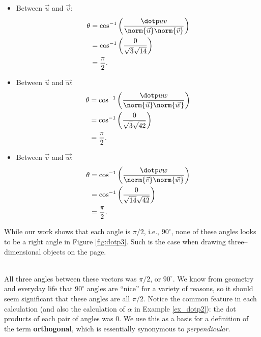{\begin{itemize}
	\item Between $\vec u$ and $\vec v$:
	\begin{align*}
	\theta &= \cos^{-1}\left(\frac{\dotp uv}{\norm{\vec u}\norm{\vec v}}\right)\\
					&= \cos^{-1}\left(\frac{0}{\sqrt{3}\sqrt{14}}\right)\\
					&= \frac{\pi}2.
	\end{align*}
	\item	Between $\vec u$ and $\vec w$:
	\begin{align*}
	\theta &= \cos^{-1}\left(\frac{\dotp uw}{\norm{\vec u}\norm{\vec w}}\right)\\
					&= \cos^{-1}\left(\frac{0}{\sqrt{3}\sqrt{42}}\right)\\
					&= \frac{\pi}2.
	\end{align*}
	\item	Between $\vec v$ and $\vec w$:
	\begin{align*}
	\theta &= \cos^{-1}\left(\frac{\dotp vw}{\norm{\vec v}\norm{\vec w}}\right)\\
					&= \cos^{-1}\left(\frac{0}{\sqrt{14}\sqrt{42}}\right)\\
					&= \frac{\pi}2.
	\end{align*}
\end{itemize}
While our work shows that each angle is $\pi/2$, i.e.,  $90^\circ$, none of these angles looks to be a right angle in Figure \ref{fig:dotp3}. Such is the case when drawing three--dimensional objects on the page.
}\\

All three angles between these vectors was $\pi/2$, or $90^\circ$. We know from geometry and everyday life that $90^\circ$ angles are ``nice'' for a variety of reasons, so it should seem significant that these angles are all $\pi/2$. Notice the common feature in each calculation (and also the calculation of $\alpha$ in Example \ref{ex_dotp2}): the dot products of each pair of angles was 0. We use this as a basis for a definition of the term \textbf{orthogonal}, which is essentially synonymous to \textit{perpendicular}.

